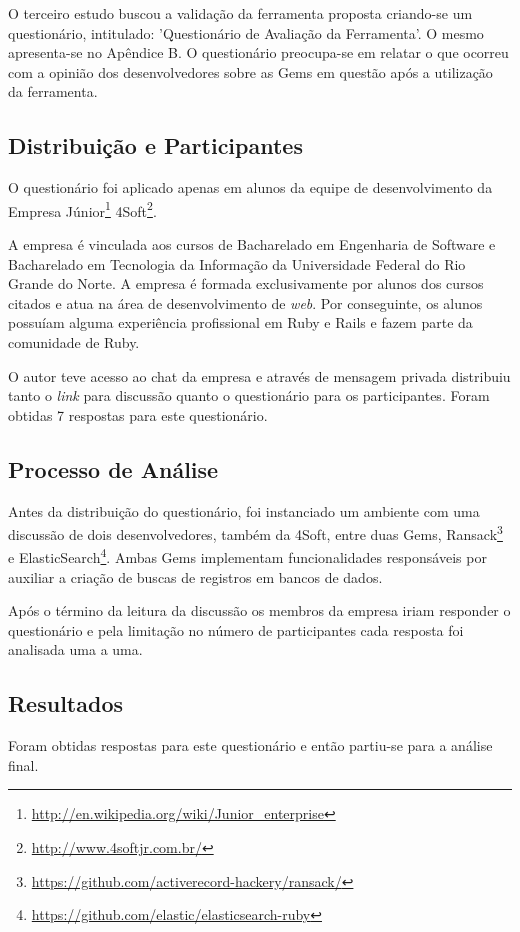 O terceiro estudo buscou a validação da ferramenta proposta criando-se um questionário, intitulado: 'Questionário de Avaliação da Ferramenta'. O mesmo apresenta-se no Apêndice B. O questionário preocupa-se em relatar o que ocorreu com a opinião dos desenvolvedores sobre as Gems em questão após a utilização da ferramenta.

\subsection{Distribuição e Participantes}

O questionário foi aplicado apenas em alunos da equipe de desenvolvimento da Empresa Júnior\footnote{\url{http://en.wikipedia.org/wiki/Junior_enterprise}} 4Soft\footnote{\url{http://www.4softjr.com.br/}}. 

A empresa é vinculada aos cursos de Bacharelado em Engenharia de Software e Bacharelado em Tecnologia da Informação da Universidade Federal do Rio Grande do Norte. A empresa é formada exclusivamente por alunos dos cursos citados e atua na área de desenvolvimento de \textit{web}. Por conseguinte, os alunos possuíam alguma experiência profissional em Ruby e Rails e fazem parte da comunidade de Ruby. 

O autor teve acesso ao chat da empresa e através de mensagem privada distribuiu tanto o \textit{link} para discussão quanto o questionário para os participantes. Foram obtidas 7 respostas para este questionário.

\subsection{Processo de Análise}

Antes da distribuição do questionário, foi instanciado um ambiente com uma discussão de dois desenvolvedores, também da 4Soft, entre duas Gems, Ransack\footnote{\url{https://github.com/activerecord-hackery/ransack/}} e ElasticSearch\footnote{\url{https://github.com/elastic/elasticsearch-ruby}}. Ambas Gems implementam funcionalidades responsáveis por auxiliar a criação de buscas de registros em bancos de dados.

Após o término da leitura da discussão os membros da empresa iriam responder o questionário e pela limitação no número de participantes cada resposta foi analisada uma a uma.

\subsection{Resultados}

Foram obtidas respostas para este questionário e então partiu-se para a análise final.
